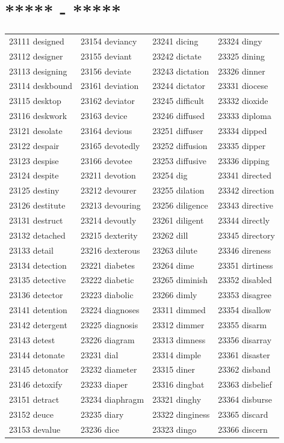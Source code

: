 \documentclass[10pt, oneside]{book}
\begin{document}
\begin{table}
	\centering
	\section*{***** - *****}
	\begin{tabular}{l l l l}
23111 designed &23154 deviancy &23241 dicing &23324 dingy\\
23112 designer &23155 deviant &23242 dictate &23325 dining\\
23113 designing &23156 deviate &23243 dictation &23326 dinner\\
23114 deskbound &23161 deviation &23244 dictator &23331 diocese\\
23115 desktop &23162 deviator &23245 difficult &23332 dioxide\\
23116 deskwork &23163 device &23246 diffused &23333 diploma\\
23121 desolate &23164 devious &23251 diffuser &23334 dipped\\
23122 despair &23165 devotedly &23252 diffusion &23335 dipper\\
23123 despise &23166 devotee &23253 diffusive &23336 dipping\\
23124 despite &23211 devotion &23254 dig &23341 directed\\
23125 destiny &23212 devourer &23255 dilation &23342 direction\\
23126 destitute &23213 devouring &23256 diligence &23343 directive\\
23131 destruct &23214 devoutly &23261 diligent &23344 directly\\
23132 detached &23215 dexterity &23262 dill &23345 directory\\
23133 detail &23216 dexterous &23263 dilute &23346 direness\\
23134 detection &23221 diabetes &23264 dime &23351 dirtiness\\
23135 detective &23222 diabetic &23265 diminish &23352 disabled\\
23136 detector &23223 diabolic &23266 dimly &23353 disagree\\
23141 detention &23224 diagnoses &23311 dimmed &23354 disallow\\
23142 detergent &23225 diagnosis &23312 dimmer &23355 disarm\\
23143 detest &23226 diagram &23313 dimness &23356 disarray\\
23144 detonate &23231 dial &23314 dimple &23361 disaster\\
23145 detonator &23232 diameter &23315 diner &23362 disband\\
23146 detoxify &23233 diaper &23316 dingbat &23363 disbelief\\
23151 detract &23234 diaphragm &23321 dinghy &23364 disburse\\
23152 deuce &23235 diary &23322 dinginess &23365 discard\\
23153 devalue &23236 dice &23323 dingo &23366 discern\\
	\end{tabular}
 \end{table}
\end{document}
